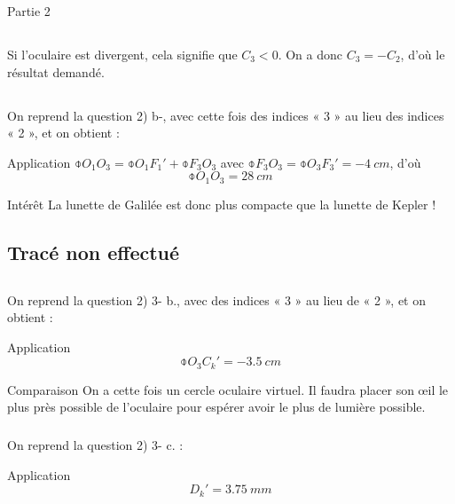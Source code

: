 \documentclass[10pt,a5paper,notitlepage]{book}
\begin{document}
\begin{center}
    \huge Partie 2
\end{center}

\subsection{}
Si l'oculaire est divergent, cela signifie que $C_3 < 0$. On a donc $C_3 = -
C_2$, d'où le résultat demandé.

\subsection{}
On reprend la question 2) b-, avec cette fois des indices « 3 » au lieu des
indices « 2 », et on obtient :

\begin{NCexem}{Application}
    $\obar{O_1O_3} = \obar{O_1F_1'} + \obar{F_3O_3}$ avec $\obar{F_3O_3} =
    \obar{O_3F_3'} = \SI{-4}{cm}$, d'où
    \[ \boxed{\obar{O_1O_3} = \SI{+28}{cm}} \]
\end{NCexem}

\begin{inte}{Intérêt}
    La lunette de Galilée est donc plus compacte que la lunette de Kepler !
\end{inte}

\subsection{Tracé non effectué}

\subsection{}
\subsubsection{}
On reprend la question 2) 3- b., avec des indices « 3 » au lieu de « 2 », et on
obtient :
\begin{NCexem}{Application}
    \[ \boxed{\obar{O_3C_k'} = \SI{-3.5}{cm}}\]
\end{NCexem}

\begin{NCrema}{Comparaison}
    On a cette fois un cercle oculaire virtuel. Il faudra placer son œil le plus
    près possible de l'oculaire pour espérer avoir le plus de lumière possible.
\end{NCrema}

\subsubsection{}
On reprend la question 2) 3- c. :
\begin{NCexem}{Application}
    \[ \boxed{D_k' = \SI{3.75}{mm}} \]
\end{NCexem}
\end{document}
